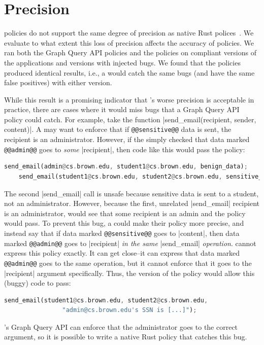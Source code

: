 \section{Precision}
\label{sec:precision}
\syslang{} policies do not support the same degree of precision as native Rust polices~.
%
We evaluate to what extent this loss of precision affects the accuracy of \syslang{} policies.
%
We ran both the Graph Query API policies and the \syslang{} policies on compliant versions of the applications and 
versions with injected bugs.
%
We found that the policies produced identical results, 
i.e., a \dev{} would catch the same bugs (and have the same false positives) with either version.
%

While this result is a promising indicator that \syslang's worse precision is acceptable in practice,
there are cases where it would miss bugs that a Graph Query API policy could catch.
%
For example, take the function |send_email(recipient, sender, content)|.
%
A \ce{} may want to enforce that if \lstinline[language=CNL]|@@sensitive@@| data is sent,
the recipient is an administrator.
%
However, if the \ce{} simply checked that data marked \lstinline[language=CNL]|@@admin@@| goes to \emph{some} |recipient|,
then code like this would pass the policy:
\begin{lstlisting}[language=Rust]
    send_email(admin@cs.brown.edu, student1@cs.brown.edu, benign_data);
    send_email(student1@cs.brown.edu, student2@cs.brown.edu, sensitive_data);
\end{lstlisting}
The second |send_email| call is unsafe because sensitive data is sent to a student, not an administrator.
%
However, because the first, unrelated |send_email| recipient is an administrator, \sys{} would see that some recipient is an admin and the policy would pass.
%
To prevent this bug, a \ce{} could make their policy more precise, and instead say that if data marked \lstinline[language=CNL]|@@sensitive@@| goes to |content|,
then data marked \lstinline[language=CNL]|@@admin@@| goes to |recipient| \emph{in the same} |send_email| \emph{operation}.
%
\syslang{} cannot express this policy exactly.
%
It can get close--it can express that data marked \lstinline[language=CNL]|@@admin@@| goes to the same operation,
but it cannot enforce that it goes to the |recipient| argument specifically.
%
Thus, the \syslang{} version of the policy would allow this (buggy) code to pass:
\begin{lstlisting}[language=Rust]
    send_email(student1@cs.brown.edu, student2@cs.brown.edu, 
                "admin@cs.brown.edu's SSN is [...]");
\end{lstlisting}
%
\sys{}'s Graph Query API can enforce that the administrator goes to the correct argument,
so it is possible to write a native Rust policy that catches this bug.

